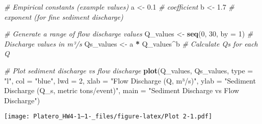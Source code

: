 \documentclass[
]{article}
\newenvironment{Shaded}{\begin{snugshade}}{\end{snugshade}}
\newcommand{\AttributeTok}[1]{\textcolor[rgb]{0.13,0.29,0.53}{#1}}
\newcommand{\CommentTok}[1]{\textcolor[rgb]{0.56,0.35,0.01}{\textit{#1}}}
\newcommand{\DecValTok}[1]{\textcolor[rgb]{0.00,0.00,0.81}{#1}}
\newcommand{\FloatTok}[1]{\textcolor[rgb]{0.00,0.00,0.81}{#1}}
\newcommand{\FunctionTok}[1]{\textcolor[rgb]{0.13,0.29,0.53}{\textbf{#1}}}
\newcommand{\NormalTok}[1]{#1}
\newcommand{\OtherTok}[1]{\textcolor[rgb]{0.56,0.35,0.01}{#1}}
\newcommand{\SpecialCharTok}[1]{\textcolor[rgb]{0.81,0.36,0.00}{\textbf{#1}}}
\newcommand{\StringTok}[1]{\textcolor[rgb]{0.31,0.60,0.02}{#1}}
\begin{document}
\begin{Shaded}
\begin{Highlighting}[]
\CommentTok{\# Empirical constants (example values)}
\NormalTok{a }\OtherTok{\textless{}{-}} \FloatTok{0.1}   \CommentTok{\# coefficient}
\NormalTok{b }\OtherTok{\textless{}{-}} \FloatTok{1.7}   \CommentTok{\# exponent (for fine sediment discharge)}

\CommentTok{\# Generate a range of flow discharge values}
\NormalTok{Q\_values }\OtherTok{\textless{}{-}} \FunctionTok{seq}\NormalTok{(}\DecValTok{0}\NormalTok{, }\DecValTok{30}\NormalTok{, }\AttributeTok{by =} \DecValTok{1}\NormalTok{)  }\CommentTok{\# Discharge values in m³/s}
\NormalTok{Qs\_values }\OtherTok{\textless{}{-}}\NormalTok{ a }\SpecialCharTok{*}\NormalTok{ Q\_values}\SpecialCharTok{\^{}}\NormalTok{b     }\CommentTok{\# Calculate Qs for each Q}

\CommentTok{\# Plot sediment discharge vs flow discharge}
\FunctionTok{plot}\NormalTok{(Q\_values, Qs\_values, }\AttributeTok{type =} \StringTok{"l"}\NormalTok{, }\AttributeTok{col =} \StringTok{"blue"}\NormalTok{, }\AttributeTok{lwd =} \DecValTok{2}\NormalTok{,}
     \AttributeTok{xlab =} \StringTok{"Flow Discharge (Q, m³/s)"}\NormalTok{, }\AttributeTok{ylab =} \StringTok{"Sediment Discharge (Q\_s, metric tons/event)"}\NormalTok{,}
     \AttributeTok{main =} \StringTok{"Sediment Discharge vs Flow Discharge"}\NormalTok{)}
\end{Highlighting}
\end{Shaded}

\texttt{[image: Platero\_HW4-1--1-\_files/figure-latex/Plot 2-1.pdf]}
\end{document}
